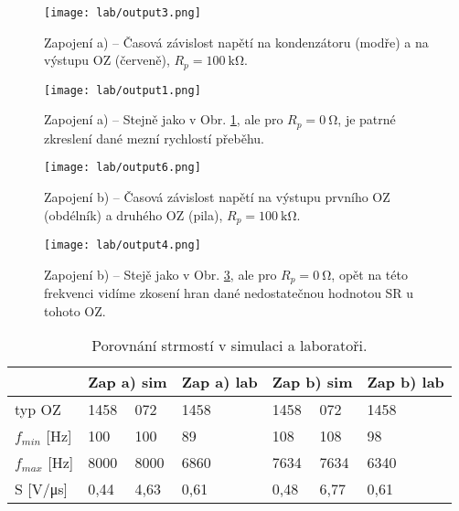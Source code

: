 
\begin{figure}[h!]
    \centering
    \texttt{[image: lab/output3.png]}
    \caption{Zapojení a) -- Časová závislost napětí na kondenzátoru (modře) a na výstupu OZ (červeně), \(R_{p} =\qty{100}{\kilo\ohm}\).}
    \label{fig:lab/output3.png}
\end{figure}

\begin{figure}[h!]
    \centering
    \texttt{[image: lab/output1.png]}
    \caption{Zapojení a) -- Stejně jako v Obr. \ref{fig:lab/output3.png}, ale pro \(R_{p} =\qty{0}{\ohm}\), je patrné zkreslení dané mezní rychlostí přeběhu.}
    \label{fig:lab/output1.png}
\end{figure}

\begin{figure}[h!]
    \centering
    \texttt{[image: lab/output6.png]}
    \caption{Zapojení b) -- Časová závislost napětí na výstupu prvního OZ (obdélník) a druhého OZ (pila), \(R_{p} =\qty{100}{\kilo\ohm}\).}
    \label{fig:lab/output6.png}
\end{figure}

\begin{figure}[h!]
    \centering
    \texttt{[image: lab/output4.png]}
    \caption{Zapojení b) -- Stejě jako v Obr. \ref{fig:lab/output6.png}, ale pro \(R_{p} =\qty{0}{\ohm}\), opět na této frekvenci vidíme zkosení hran dané nedostatečnou hodnotou SR u tohoto OZ.}
    \label{fig:lab/output4.png}
\end{figure}



\begin{table}[]
    \caption{Porovnání strmostí v simulaci a laboratoři.}
    \centering
    \def\arraystretch{1.4}
    \begin{tabular}{l|l|l|l||l|l|l}
        & \multicolumn{2}{l|}{Zap a) sim} & Zap a) lab & \multicolumn{2}{l|}{Zap b) sim} & Zap b) lab \\ \hline
    typ OZ             & 1458       & 072   & 1458       & 1458       & 072   & 1458       \\ \hline
    \(f_{min} \)  [Hz]      & 100        &   100   & 89         & 108        &    108  & 98         \\ \hline
    \(f_{max} \)  [Hz]      & 8000       &   8000   & 6860       & 7634       &    7634  & 6340       \\ \hline
    S [V/\unit{\micro\second}] & 0,44       & 4,63 & 0,61       & 0,48       & 6,77 & 0,61      
    \end{tabular}
    \label{tab:tabulka_hodnot_brewster}
    \end{table}
